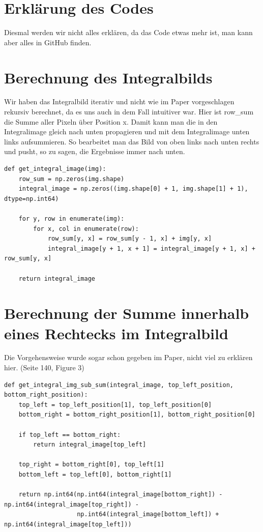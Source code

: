 \section*{Erklärung des Codes}
Diesmal werden wir nicht alles erklären, da das Code etwas mehr ist, man kann aber alles in GitHub finden.


\section*{Berechnung des Integralbilds}
Wir haben das Integralbild iterativ und nicht wie im Paper vorgeschlagen rekursiv berechnet,
da es uns auch in dem Fall intuitiver war. Hier ist row\_sum die Summe aller Pixeln über Position x.
Damit kann man die in den Integralimage gleich nach unten propagieren und mit dem Integralimage unten links
aufsummieren. So bearbeitet man das Bild von oben links nach unten rechts und pusht, so zu sagen, die Ergebnisse
immer nach unten.

\begin{lstlisting}[style=py]
def get_integral_image(img):
    row_sum = np.zeros(img.shape)
    integral_image = np.zeros((img.shape[0] + 1, img.shape[1] + 1), dtype=np.int64)

    for y, row in enumerate(img):
        for x, col in enumerate(row):
            row_sum[y, x] = row_sum[y - 1, x] + img[y, x]
            integral_image[y + 1, x + 1] = integral_image[y + 1, x] + row_sum[y, x]

    return integral_image
\end{lstlisting}

\section*{Berechnung der Summe innerhalb eines Rechtecks im Integralbild}

Die Vorgehensweise wurde sogar schon gegeben im Paper, nicht viel zu erklären hier. (Seite 140, Figure 3)
\begin{lstlisting}[style=py]
def get_integral_img_sub_sum(integral_image, top_left_position, bottom_right_position):
    top_left = top_left_position[1], top_left_position[0]
    bottom_right = bottom_right_position[1], bottom_right_position[0]

    if top_left == bottom_right:
        return integral_image[top_left]

    top_right = bottom_right[0], top_left[1]
    bottom_left = top_left[0], bottom_right[1]

    return np.int64(np.int64(integral_image[bottom_right]) - np.int64(integral_image[top_right]) -
                    np.int64(integral_image[bottom_left]) + np.int64(integral_image[top_left]))

\end{lstlisting}

